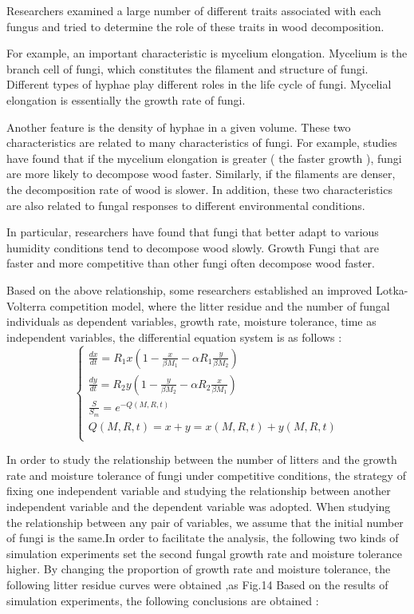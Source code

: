 \documentclass{mcmthesis}
\begin{document}
Researchers examined a large number of different traits associated with each fungus and tried to determine the role of these traits in wood decomposition. 

For example, an important characteristic is mycelium elongation. Mycelium is the branch cell of fungi, which constitutes the filament and structure of fungi. Different types of hyphae play different roles in the life cycle of fungi. Mycelial elongation is essentially the growth rate of fungi.

Another feature is the density of hyphae in a given volume. These two characteristics are related to many characteristics of fungi. For example, studies have found that if the mycelium elongation is greater ( the faster growth ), fungi are more likely to decompose wood faster. Similarly, if the filaments are denser, the decomposition rate of wood is slower. In addition, these two characteristics are also related to fungal responses to different environmental conditions. 

In particular, researchers have found that fungi that better adapt to various humidity conditions tend to decompose wood slowly. Growth Fungi that are faster and more competitive than other fungi often decompose wood faster. 

Based on the above relationship, some researchers established an improved Lotka-Volterra competition model, where the litter residue and the number of fungal individuals as dependent variables, growth rate, moisture tolerance, time as independent variables, the differential equation system is as follows :
$$\left\{
\begin{array}{l}
	\frac{d x}{d t}=R_{1} x\left(1-\frac{x}{\beta M_{1}}-\alpha R_{1} \frac{y}{\beta M_{2}}\right)\\
	\frac{d y}{d t}=R_{2} y\left(1-\frac{y}{\beta M_{2}}-\alpha R_{2} \frac{x}{\beta M_{1}}\right)\\
	\frac{S}{S_m}=e^{-Q(M,R,t)}\\
	Q(M,R,t)=x+y=x(M,R,t)+y(M,R,t)\\
\end{array}
\right.
$$

In order to study the relationship between the number of litters and the growth rate and moisture tolerance of fungi under competitive conditions, the strategy of fixing one independent variable and studying the relationship between another independent variable and the dependent variable was adopted. When studying the relationship between any pair of variables, we assume that the initial number of fungi is the same.In order to facilitate the analysis, the following two kinds of simulation experiments set the second fungal growth rate and moisture tolerance higher. By changing the proportion of growth rate and moisture tolerance, the following litter residue curves were obtained ,as Fig.14
Based on the results of simulation experiments, the following conclusions are obtained : 
\end{document}
